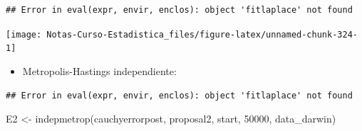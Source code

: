 \documentclass[
  12pt,
]{book}
\newenvironment{Shaded}{\begin{snugshade}}{\end{snugshade}}
\newcommand{\AttributeTok}[1]{\textcolor[rgb]{0.77,0.63,0.00}{#1}}
\newcommand{\DecValTok}[1]{\textcolor[rgb]{0.00,0.00,0.81}{#1}}
\newcommand{\FloatTok}[1]{\textcolor[rgb]{0.00,0.00,0.81}{#1}}
\newcommand{\FunctionTok}[1]{\textcolor[rgb]{0.00,0.00,0.00}{#1}}
\newcommand{\NormalTok}[1]{#1}
\newcommand{\OtherTok}[1]{\textcolor[rgb]{0.56,0.35,0.01}{#1}}
\newcommand{\SpecialCharTok}[1]{\textcolor[rgb]{0.00,0.00,0.00}{#1}}
\newcommand{\StringTok}[1]{\textcolor[rgb]{0.31,0.60,0.02}{#1}}
\providecommand{\tightlist}{%
  \setlength{\itemsep}{0pt}\setlength{\parskip}{0pt}}
\begin{document}
\begin{verbatim}
## Error in eval(expr, envir, enclos): object 'fitlaplace' not found
\end{verbatim}

\begin{Shaded}
\end{Shaded}

\begin{center}\texttt{[image: Notas-Curso-Estadistica\_files/figure-latex/unnamed-chunk-324-1]} \end{center}

\begin{itemize}
\tightlist
\item
  Metropolis-Hastings independiente:
\end{itemize}

\begin{Shaded}
\end{Shaded}

\begin{verbatim}
## Error in eval(expr, envir, enclos): object 'fitlaplace' not found
\end{verbatim}

\begin{Shaded}
\begin{Highlighting}[]
\NormalTok{E2 }\OtherTok{\textless{}{-}} \FunctionTok{indepmetrop}\NormalTok{(cauchyerrorpost, proposal2, start,}
    \DecValTok{50000}\NormalTok{, data\_darwin)}
\end{Highlighting}
\end{Shaded}
\end{document}
